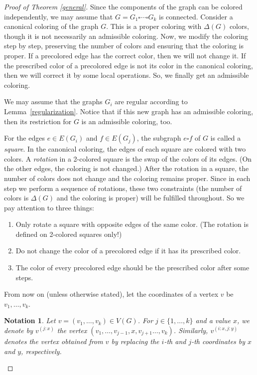 \documentclass[a4paper,12pt]{article}
\newtheorem{nota}[theorem]{\bf Notation}
\begin{document}
\begin{proof}[Proof of Theorem \ref{general}]
    Since the components of the graph can be colored independently, we may assume that $G = G_1 \square \cdots \square G_k$ is connected. Consider a canonical coloring of the graph $G$. This is a proper coloring with $\Delta(G)$ colors, though it is not necessarily an admissible coloring. Now, we modify the coloring step by step, preserving the number of colors and ensuring that the coloring is proper. If a precolored edge has the correct color, then we will not change it. If the prescribed color of a precolored edge is not its color in the canonical coloring, then we will correct it by some local operations. So, we finally get an admissible coloring.

    We may assume that the graphs $G_i$ are regular according to Lemma~\ref{regularization}. Notice that if this new graph has an admissible coloring, then its restriction for $G$ is an admissible coloring, too. 

    For the edges $e \in E(G_i)$ and $f \in E(G_j)$, the subgraph $e \square f$ of $G$ is called a \textit{square}. In the canonical coloring, the edges of each square are colored with two colors. A {\it rotation} in a 2-colored square is the swap of the colors of its edges. (On the other edges, the coloring is not changed.) After the rotation in a square, the number of colors does not change and the coloring remains proper. Since in each step we perform a sequence of rotations, these two constraints (the number of colors is $\Delta(G)$ and the coloring is proper) will be fulfilled throughout. So we pay attention to three things:
    \begin{enumerate}
        \item Only rotate a square with opposite edges of the same color. (The rotation is defined on 2-colored squares only!)
        \item Do not change the color of a precolored edge if it has its prescribed color.
        \item The color of every precolored edge should be the prescribed color after some steps.
    \end{enumerate}

    From now on (unless otherwise stated), let the coordinates of a vertex $v$ be $v_1, \dots, v_k$.

    \begin{nota}
        \textup{Let $v = (v_1, \dots, v_k) \in V(G)$. For $j \in \{1, \dots, k\}$ and a value $x$, we denote by $v^{(j:x)}$ the vertex $(v_1, \dots, v_{j-1}, x, v_{j+1} \dots, v_k)$. Similarly, $v^{(i:x, j:y)}$ denotes the vertex obtained from $v$ by replacing the $i$-th and $j$-th coordinates by $x$ and $y$, respectively.}
    \end{nota}


\end{proof}
\end{document}

